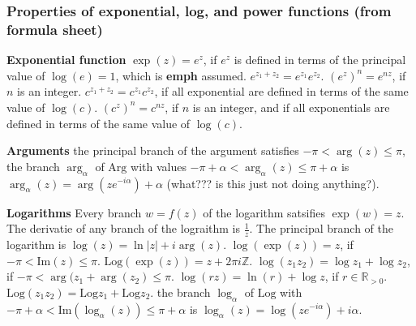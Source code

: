 \documentclass{article}
\theoremstyle{plain}
\theoremstyle{remark}
\newcommand{\Z}{{\mathbb Z}}
\newcommand{\R}{{\mathbb R}}
\begin{document}
\subsubsection{Properties of exponential, log, and power functions
(from formula sheet)}
\textbf{Exponential function} $\exp(z) = e^z$, if $e^z$ is defined
in terms of the principal value of $\log(e) = 1$, which is \textbf{emph} assumed.
\newline $e^{z_1 + z_2} = e^{z_1}e^{z_2}$.
\newline $(e^z)^n = e^{nz}$, if $n$ is an integer.
\newline $c^{z_1 + z_2} = c^{z_1}c^{z_2}$,
if all exponential are defined in terms of the same value of $\log(c)$.
\newline $(c^z)^n = c^{nz}$, if $n$ is an integer,
and if all exponentials are defined in terms of the same value of $\log(c)$.

\textbf{Arguments} the principal branch of the argument satisfies $-\pi < \arg(z) \leq \pi$,
the branch $\arg_\alpha$ of $\mathrm{Arg}$ with values
$-\pi + \alpha < \arg_\alpha(z) \leq \pi + \alpha$ is
$\arg_\alpha(z) = \arg(ze^{-i\alpha}) + \alpha$
(what??? is this just not doing anything?).

\textbf{Logarithms} Every branch $w = f(z)$ of the logarithm satsifies $\exp(w) = z$.
\newline The derivatie of any branch of the lograithm is $\frac{1}{z}$.
\newline The principal branch of the logarithm is $\log(z) = \ln|z| + i\arg(z)$.
\newline $\log(\exp(z)) = z$, if $-\pi < \mathrm{Im}(z) \leq \pi$.
\newline $\mathrm{Log}(\exp(z)) = z + 2\pi i \Z$.
\newline $\log(z_1z_2) = \log{z_1} + \log{z_2}$,
if $- \pi < \arg(z_1 + \arg(z_2) \leq \pi$.
\newline $\log(rz) = \ln(r) + \log{z}$, if $r \in \R_{>0}$.
\newline $\mathrm{Log}(z_1z_2) = \mathrm{Log}z_1 + \mathrm{Log}z_2$.
\newline the branch $\log_\alpha$ of $\mathrm{Log}$ with
$-\pi + \alpha < \mathrm{Im}(\log_\alpha(z)) \leq \pi + \alpha$
is $\log_\alpha(z) = \log(ze^{-i\alpha}) + i\alpha$.
\end{document}
